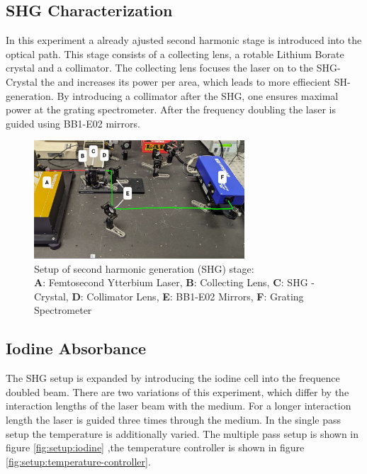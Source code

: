 \newpage
\subsection{SHG Characterization}
In this experiment a already ajusted second harmonic stage is introduced into the optical path. 
This stage consists of a collecting lens, a rotable Lithium Borate crystal and a collimator. 
The collecting lens focuses the laser on to the SHG-Crystal the and increases its power per area, which leads to more effiecient SH-generation.
By introducing a collimator after the SHG, one ensures maximal power at the grating spectrometer.
After the frequency doubling the laser is guided using BB1-E02 mirrors.
\begin{figure}[H]
    \centering
    \captionsetup{margin=3cm}
    \includegraphics[width=0.7\textwidth]{graphics/shg-setup1.jpg}
    \caption{
        Setup of second harmonic generation (SHG) stage: \\
        \textbf{A}: Femtosecond Ytterbium Laser,
        \textbf{B}: Collecting Lens, 
        \textbf{C}: SHG - Crystal,
        \textbf{D}: Collimator Lens,
        \textbf{E}: BB1-E02 Mirrors,
        \textbf{F}: Grating Spectrometer
    }
    \label{fig:setup:shg}
\end{figure}
\subsection{Iodine Absorbance}
The SHG setup is expanded by introducing the iodine cell into the frequence doubled beam.
There are two variations of this experiment, which differ by the interaction lengths of the laser beam with the medium.
For a longer interaction length the laser is guided three times through the medium.
In the single pass setup the temperature is additionally varied.
The multiple pass setup is shown in figure \ref{fig:setup:iodine} ,the temperature controller is shown in figure \ref{fig:setup:temperature-controller}.
 
